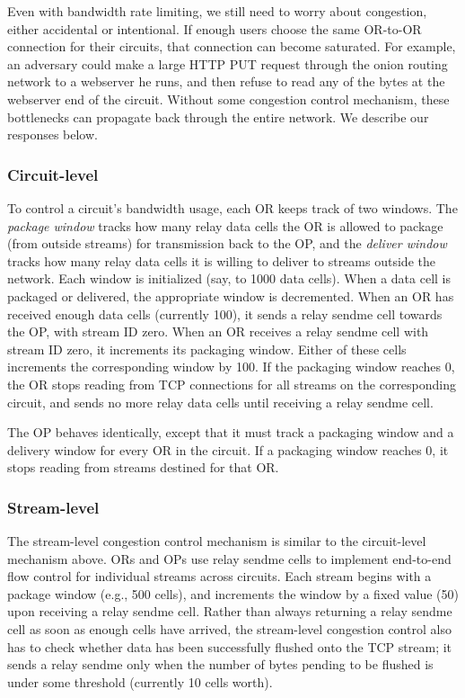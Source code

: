 \documentclass[times,10pt,twocolumn]{article}
\begin{document}
Even with bandwidth rate limiting, we still need to worry about
congestion, either accidental or intentional. If enough users choose the
same OR-to-OR connection for their circuits, that connection can become
saturated. For example, an adversary could make a large HTTP PUT request
through the onion routing network to a webserver he runs, and then
refuse to read any of the bytes at the webserver end of the
circuit. Without some congestion control mechanism, these bottlenecks
can propagate back through the entire network.  We describe our
responses below.

\subsubsection{Circuit-level}

To control a circuit's bandwidth usage, each OR keeps track of two
windows. The \emph{package window} tracks how many relay data cells the OR is
allowed to package (from outside streams) for transmission back to the OP,
and the \emph{deliver window} tracks how many relay data cells it is willing
to deliver to streams outside the network. Each window is initialized
(say, to 1000 data cells). When a data cell is packaged or delivered,
the appropriate window is decremented. When an OR has received enough
data cells (currently 100), it sends a relay sendme cell towards the OP,
with stream ID zero. When an OR receives a relay sendme cell with stream
ID zero, it increments its packaging window. Either of these cells
increments the corresponding window by 100. If the packaging window
reaches 0, the OR stops reading from TCP connections for all streams
on the corresponding circuit, and sends no more relay data cells until
receiving a relay sendme cell.

The OP behaves identically, except that it must track a packaging window
and a delivery window for every OR in the circuit. If a packaging window
reaches 0, it stops reading from streams destined for that OR.

\subsubsection{Stream-level}

The stream-level congestion control mechanism is similar to the
circuit-level mechanism above. ORs and OPs use relay sendme cells
to implement end-to-end flow control for individual streams across
circuits. Each stream begins with a package window (e.g., 500 cells),
and increments the window by a fixed value (50) upon receiving a relay
sendme cell. Rather than always returning a relay sendme cell as soon
as enough cells have arrived, the stream-level congestion control also
has to check whether data has been successfully flushed onto the TCP
stream; it sends a relay sendme only when the number of bytes pending
to be flushed is under some threshold (currently 10 cells worth).
\end{document}
